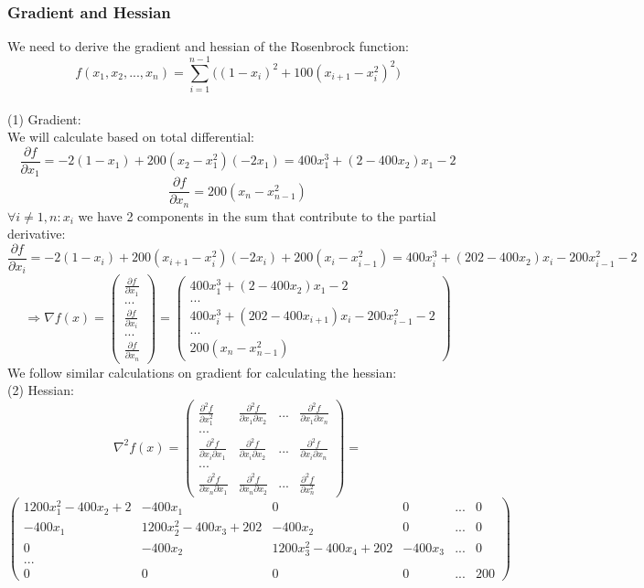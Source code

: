 \documentclass[12pt]{article}
\begin{document}
\subsubsection{Gradient and Hessian}
We need to derive the gradient and hessian of the Rosenbrock function:
$$f(x_1,x_2,...,x_n) = \sum_{i=1}^{n-1}\big((1-x_i)^2 + 100(x_{i+1} - x_i^2)^2\big) $$
\\
(1) Gradient:\\
We will calculate based on total differential:\\
$$\frac{\partial f}{\partial x_1} = -2(1-x_1) + 200(x_2-x_1^2)(-2x_1)=400x_1^3+(2-400x_2)x_1-2$$
$$\frac{\partial f}{\partial x_n} = 200(x_n-x_{n-1}^2)$$
$\forall i \neq 1,n : x_i$ we have 2 components in the sum that contribute to the partial derivative:\\
$$\frac{\partial f}{\partial x_i} = -2(1-x_i) + 200(x_{i+1}-x_i^2)(-2x_i) + 200(x_i-x_{i-1}^2)=400x_i^3+(202-400x_2)x_i - 200x_{i-1}^2 -2$$
$$\Rightarrow \nabla f(x) = 
\begin{pmatrix}
    \frac{\partial f}{\partial x_1} \\
    ...\\
    \frac{\partial f}{\partial x_i}\\
    ...\\
    \frac{\partial f}{\partial x_n}
\end{pmatrix} =
\begin{pmatrix}
    400x_1^3+(2-400x_2)x_1-2 \\
    ...\\
    400x_i^3+(202-400x_{i+1})x_i - 200x_{i-1}^2 -2\\
    ...\\
    200(x_n-x_{n-1}^2)
\end{pmatrix}
$$
\newpage
We follow similar calculations on gradient for calculating the hessian:\\
(2) Hessian:\\
$$\nabla^2 f(x) = 
\begin{pmatrix}
    \frac{\partial^2 f}{\partial x_1^2} & \frac{\partial^2 f}{\partial x_1 \partial x_2} & ... & \frac{\partial^2 f}{\partial x_1 \partial x_n}\\
    ...\\
    \frac{\partial^2 f}{\partial x_i\partial x_1} & \frac{\partial^2 f}{\partial x_i \partial x_2} & ... & \frac{\partial^2 f}{\partial x_i \partial x_n}\\
    ...\\
    \frac{\partial^2 f}{\partial x_n \partial x_1} & \frac{\partial^2 f}{\partial x_n \partial x_2} & ... & \frac{\partial^2 f}{\partial x_n^2}
\end{pmatrix} =$$
$$
\begin{pmatrix}
    1200x_1^2-400x_2+2 & -400x_1              & 0 & 0 &... & 0 \\
    -400x_1            & 1200x_2^2-400x_3+202 & -400x_2 & 0 & ... & 0 \\
    0                  & -400x_2        & 1200x_3^2-400x_4+202 & -400x_3 &  ... & 0 \\
    ...\\
    0                  & 0                    & 0     & 0 &  ... & 200
\end{pmatrix}
$$
\end{document}
